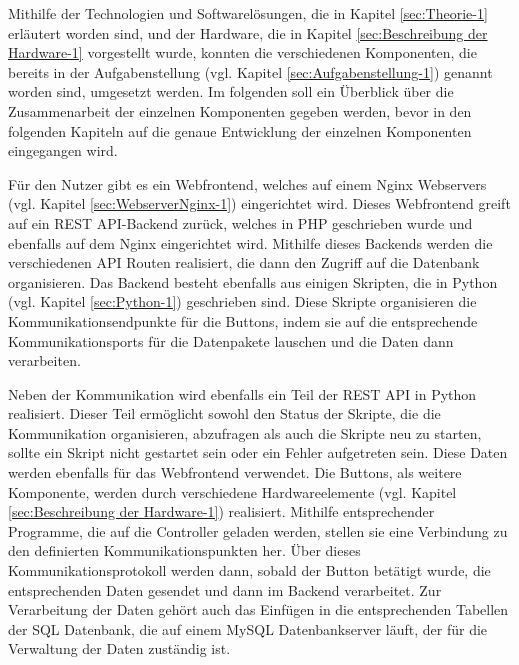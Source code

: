Mithilfe der Technologien und Softwarelösungen, die in Kapitel \ref{sec:Theorie-1} erläutert worden sind, und der Hardware, die in Kapitel \ref{sec:Beschreibung der Hardware-1} vorgestellt wurde, konnten die verschiedenen Komponenten, die bereits in der Aufgabenstellung (vgl. Kapitel \ref{sec:Aufgabenstellung-1}) genannt worden sind, umgesetzt werden. 
Im folgenden soll ein Überblick über die Zusammenarbeit der einzelnen Komponenten gegeben werden, bevor in den folgenden Kapiteln auf die genaue Entwicklung der einzelnen Komponenten eingegangen wird. 

Für den Nutzer gibt es ein Webfrontend, welches auf einem Nginx Webservers (vgl. Kapitel \ref{sec:WebserverNginx-1}) eingerichtet wird. Dieses Webfrontend greift auf ein \ac{REST} \ac{API}-Backend zurück, welches in \ac{PHP} geschrieben wurde und ebenfalls auf dem Nginx eingerichtet wird. Mithilfe dieses Backends werden die verschiedenen \ac{API} Routen realisiert, die dann den Zugriff auf die Datenbank organisieren. Das Backend besteht ebenfalls aus einigen Skripten, die in Python (vgl. Kapitel \ref{sec:Python-1}) geschrieben sind. Diese Skripte organisieren die Kommunikationsendpunkte für die Buttons, indem sie auf die entsprechende Kommunikationsports für die Datenpakete lauschen und die Daten dann verarbeiten. 

Neben der Kommunikation wird ebenfalls ein Teil der \ac{REST} \ac{API} in Python realisiert. Dieser Teil ermöglicht sowohl den Status der Skripte, die die Kommunikation organisieren, abzufragen als auch die Skripte neu zu starten, sollte ein Skript nicht gestartet sein oder ein Fehler aufgetreten sein. Diese Daten werden ebenfalls für das Webfrontend verwendet. 
Die Buttons, als weitere Komponente, werden durch verschiedene Hardwareelemente (vgl. Kapitel \ref{sec:Beschreibung der Hardware-1}) realisiert. Mithilfe entsprechender Programme, die auf die Controller geladen werden, stellen sie eine Verbindung zu den definierten Kommunikationspunkten her. Über dieses Kommunikationsprotokoll werden dann, sobald der Button betätigt wurde, die entsprechenden Daten gesendet und dann im Backend verarbeitet. 
Zur Verarbeitung der Daten gehört auch das Einfügen in die entsprechenden Tabellen der \ac{SQL} Datenbank, die auf einem MySQL Datenbankserver läuft, der für die Verwaltung der Daten zuständig ist. 
